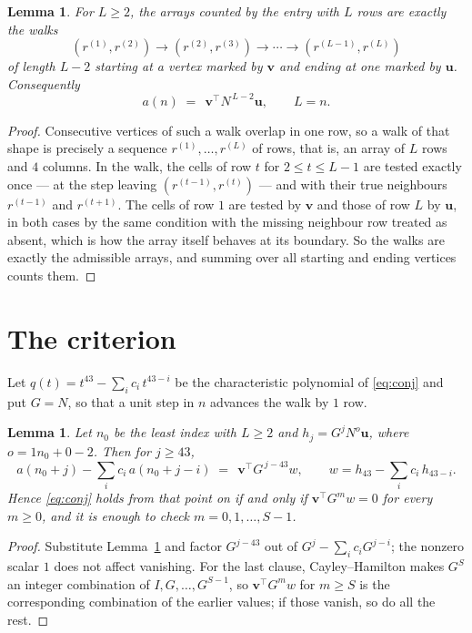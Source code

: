 \documentclass[11pt,a4paper]{article}
\theoremstyle{plain}
\newtheorem{lemma}[theorem]{Lemma}
\theoremstyle{definition}
\begin{document}
\begin{lemma}\label{lem:walk}
For $L\ge2$, the arrays counted by the entry with $L$ rows are exactly the walks
\[
(r^{(1)},r^{(2)})\to(r^{(2)},r^{(3)})\to\cdots\to(r^{(L-1)},r^{(L)})
\]
of length $L-2$ starting at a vertex marked by $\mathbf{v}$ and ending at one marked by
$\mathbf{u}$. Consequently
\[
a(n)\;=\;\,\mathbf{v}^{\!\top}N^{\,L-2}\mathbf{u},\qquad L=n .
\]
\end{lemma}

\begin{proof}
Consecutive vertices of such a walk overlap in one row, so a walk of that shape is
precisely a sequence $r^{(1)},\dots,r^{(L)}$ of rows, that is, an array of $L$ rows
and $4$ columns. In the walk, the cells of row $t$ for $2\le t\le L-1$ are tested
exactly once --- at the step leaving $(r^{(t-1)},r^{(t)})$ --- and with their true
neighbours $r^{(t-1)}$ and $r^{(t+1)}$. The cells of row $1$ are tested by
$\mathbf{v}$ and those of row $L$ by $\mathbf{u}$, in both cases by the same condition
with the missing neighbour row treated as absent, which is how the array itself behaves at
its boundary. So the walks are exactly the admissible arrays, and summing over all starting
and ending vertices counts them.
\end{proof}

\section{The criterion}

Let $q(t)=t^{43}-\sum_i c_i\,t^{43-i}$ be the characteristic polynomial of
\eqref{eq:conj} and put $G=N$, so that a unit step in $n$ advances the walk by
$1$ row.

\begin{lemma}\label{lem:crit}
Let $n_0$ be the least index with $L\ge2$ and $h_j=G^{j}N^{o}\mathbf{u}$, where
$o=1n_0+0-2$. Then for $j\ge43$,
\[
a(n_0+j)-\sum_i c_i\,a(n_0+j-i)\;=\;\,\mathbf{v}^{\!\top}G^{\,j-43}w,
\qquad w=h_{43}-\sum_i c_i\,h_{43-i} .
\]
Hence \eqref{eq:conj} holds from that point on if and only if
$\mathbf{v}^{\!\top}G^{m}w=0$ for every $m\ge0$, and it is enough to check
$m=0,1,\dots,S-1$.
\end{lemma}

\begin{proof}
Substitute Lemma~\ref{lem:walk} and factor $G^{j-43}$ out of
$G^{j}-\sum_ic_iG^{j-i}$; the nonzero scalar $1$ does not affect
vanishing. For the last clause, Cayley--Hamilton makes $G^{S}$ an integer combination of
$I,G,\dots,G^{S-1}$, so $\mathbf{v}^{\!\top}G^{m}w$ for $m\ge S$ is the corresponding
combination of the earlier values; if those vanish, so do all the rest.
\end{proof}
\end{document}
